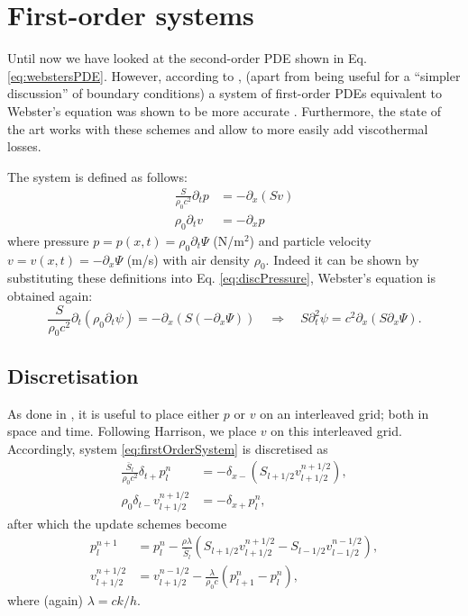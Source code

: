 \documentclass[dvipsnames]{article}
\begin{document}
\section{First-order systems}
Until now we have looked at the second-order PDE shown in Eq. \eqref{eq:webstersPDE}. However, according to \cite{Harrison2018}, (apart from being useful for a ``simpler discussion'' of boundary conditions) a system of first-order PDEs equivalent to Webster's equation was shown to be more accurate \cite{Torin2015}. Furthermore, the state of the art \cite{Harrison2018, Harrison2016} works with these schemes and allow to more easily add viscothermal losses.

The system is defined as follows:
\begin{subequations}\label{eq:firstOrderSystem}
\begin{align}
    \frac{S}{\rho_0 c^2}\partial_t p &= -\partial_x(Sv)\label{eq:discPressure}\\
    \rho_0\partial_tv &= -\partial_xp\label{eq:discVelocity}
\end{align}
\end{subequations}
where pressure $p = p(x,t) = \rho_0\partial_t \Psi$ (N/m$^2$) and particle velocity $v = v(x,t) = -\partial_x\Psi$ (m/s) with air density $\rho_0$. Indeed it can be shown by substituting these definitions into Eq. \eqref{eq:discPressure}, Webster's equation is obtained again:
\begin{equation}
  \nonumber
        \frac{S}{\rho_0 c^2}\partial_t(\rho_0 \partial_t\psi) = -\partial_x(S(-\partial_x\Psi))\quad \Longrightarrow \quad S\partial_t^2\psi = c^2\partial_x(S\partial_x\Psi).
\end{equation}
\subsection{Discretisation}
As done in \cite{Harrison2018}, it is useful to place either $p$ or $v$ on an interleaved grid; both in space and time. Following Harrison, we place $v$ on this interleaved grid. Accordingly, system \eqref{eq:firstOrderSystem} is discretised as
\begin{subequations}
    \begin{align}
        \frac{\bar S_l}{\rho_0 c^2}\delta_{t+}p_l^n &= -\delta_{x-}(S_{l+1/2}v_{l+1/2}^{n+1/2}),\\
        \rho_0 \delta_{t-}v_{l+1/2}^{n+1/2}&=-\delta_{x+}p_l^n,
    \end{align}
\end{subequations}
after which the update schemes become
\begin{subequations}
    \begin{align}
        p_l^{n+1} &= p_l^n - \frac{\rho \lambda}{\bar{S}_l}(S_{l+1/2}v_{l+1/2}^{n+1/2}-S_{l-1/2}v_{l-1/2}^{n-1/2}),\\
        v_{l+1/2}^{n+1/2} &= v_{l+1/2}^{n-1/2}-\frac{\lambda}{\rho_0 c}(p_{l+1}^n - p_l^n),
    \end{align}
\end{subequations}
where (again) $\lambda = ck/h$.
\end{document}
